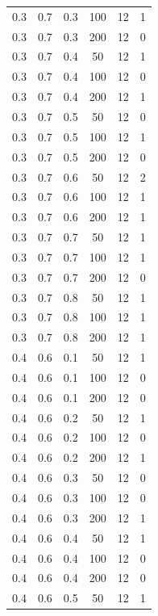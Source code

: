 \documentclass[a4paper,14pt, unknownkeysallowed]{extreport}
\begin{document}
\begin{center}
\begin{longtable}[c]{|c|c|c|c|c|c|}
	0.3 &  0.7 &  0.3 &  100 &    12 &     1 \\
	0.3 &  0.7 &  0.3 &  200 &    12 &     0 \\
   \hline
	0.3 &  0.7 &  0.4 &   50 &    12 &     1 \\
	0.3 &  0.7 &  0.4 &  100 &    12 &     0 \\
	0.3 &  0.7 &  0.4 &  200 &    12 &     1 \\
   \hline
	0.3 &  0.7 &  0.5 &   50 &    12 &     0 \\
	0.3 &  0.7 &  0.5 &  100 &    12 &     1 \\
	0.3 &  0.7 &  0.5 &  200 &    12 &     0 \\
   \hline
	0.3 &  0.7 &  0.6 &   50 &    12 &     2 \\
	0.3 &  0.7 &  0.6 &  100 &    12 &     1 \\
	0.3 &  0.7 &  0.6 &  200 &    12 &     1 \\
   \hline
	0.3 &  0.7 &  0.7 &   50 &    12 &     1 \\
	0.3 &  0.7 &  0.7 &  100 &    12 &     1 \\
	0.3 &  0.7 &  0.7 &  200 &    12 &     0 \\
   \hline
	0.3 &  0.7 &  0.8 &   50 &    12 &     1 \\
	0.3 &  0.7 &  0.8 &  100 &    12 &     1 \\
	0.3 &  0.7 &  0.8 &  200 &    12 &     1 \\
   \hline
	0.4 &  0.6 &  0.1 &   50 &    12 &     1 \\
	0.4 &  0.6 &  0.1 &  100 &    12 &     0 \\
	0.4 &  0.6 &  0.1 &  200 &    12 &     0 \\
   \hline
	0.4 &  0.6 &  0.2 &   50 &    12 &     1 \\
	0.4 &  0.6 &  0.2 &  100 &    12 &     0 \\
	0.4 &  0.6 &  0.2 &  200 &    12 &     1 \\
   \hline
	0.4 &  0.6 &  0.3 &   50 &    12 &     0 \\
	0.4 &  0.6 &  0.3 &  100 &    12 &     0 \\
	0.4 &  0.6 &  0.3 &  200 &    12 &     1 \\
   \hline
	0.4 &  0.6 &  0.4 &   50 &    12 &     1 \\
	0.4 &  0.6 &  0.4 &  100 &    12 &     0 \\
	0.4 &  0.6 &  0.4 &  200 &    12 &     0 \\
   \hline
	0.4 &  0.6 &  0.5 &   50 &    12 &     1 \\

\end{longtable}
\end{center}
\end{document}
